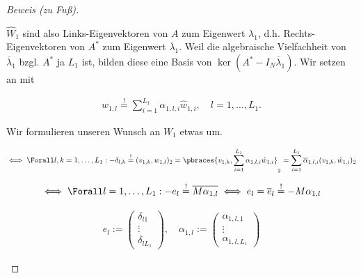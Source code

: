 \begin{proof}[Beweis (zu Fuß)]
\begin{enumerate}[label = (\roman*)]
        $\hat W_1$ sind also Links-Eigenvektoren von $A$ zum Eigenwert $\lambda_1$, d.h. Rechts-Eigenvektoren von $A^\ast$ zum Eigenwert $\overline \lambda_1$.
        Weil die algebraische Vielfachheit von $\overline \lambda_1$ bzgl. $A^\ast$ ja $L_1$ ist, bilden diese eine Basis von $\ker (A^\ast - I_N \overline \lambda_1)$.
        Wir setzen an mit

        \begin{align*}
            w_{1, l}
            \stackrel{!}{=}
            \sum_{i=1}^{L_1}
                \alpha_{1, l, i} \hat w_{1, i},
            \quad
            l = 1, \dots, L_1.
        \end{align*}

        Wir formulieren unseren Wunsch an $W_1$ etwas um.

        \begin{align*}
            \iff
            \Forall l, k = 1, \dots, L_1:
                -\delta_{l, k}
                \stackrel{!}{=}
                (v_{1, k}, w_{1, l})_2
                =
                \pbraces
                {
                    v_{1, k},
                    \sum_{i=1}^{L_1}
                        \alpha_{1, l, i} \hat w_{1, i}
                }_2
                =
                \sum_{i=1}^{L_1}
                    \overline \alpha_{1, l, i} (v_{1, k}, \hat w_{1, i})_2
        \end{align*}

        \begin{align*}
            \iff
            \Forall l = 1, \dots, L_1:
                -e_l
                \stackrel{!}{=}
                \overline{M \alpha_{1, l}}
            \iff
                e_l
                =
                \overline e_l
                \stackrel{!}{=}
                -M \alpha_{1, l}
        \end{align*}

        \begin{align*}
            e_l
            :=
            \begin{pmatrix}
                \delta_{l 1} \\ \vdots \\ \delta_{l L_1}
            \end{pmatrix},
            \quad
            \alpha_{1, l}
            :=
            \begin{pmatrix}
                \alpha_{1, l, 1} \\ \vdots \\ \alpha_{1, l, L_1}
            \end{pmatrix}
        \end{align*}


\end{enumerate}
\end{proof}
